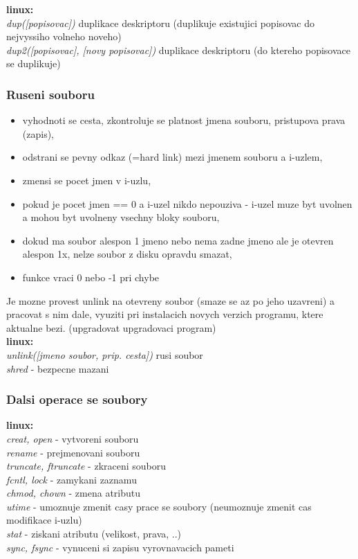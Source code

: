 \documentclass[a4paper, 11pt]{article}
\begin{document}
\textbf{linux:} \\[0.5em]
\textit{dup([popisovac])} duplikace deskriptoru (duplikuje existujici popisovac do nejvyssiho volneho noveho) \\[0.2em]
\textit{dup2([popisovac], [novy popisovac])} duplikace deskriptoru (do ktereho popisovace se duplikuje) \\

\subsubsection{Ruseni souboru}
\begin{itemize}
    \item vyhodnoti se cesta, zkontroluje se platnost jmena souboru, pristupova prava (zapis),
    \item odstrani se pevny odkaz (=hard link) mezi jmenem souboru a i-uzlem,
    \item zmensi se pocet jmen v i-uzlu,
    \item pokud je pocet jmen == 0 a i-uzel nikdo nepouziva - i-uzel muze byt uvolnen a mohou byt uvolneny vsechny bloky souboru,
    \item dokud ma soubor alespon 1 jmeno nebo nema zadne jmeno ale je otevren alespon 1x, nelze soubor z disku opravdu smazat,
    \item funkce vraci 0 nebo -1 pri chybe \\
\end{itemize}

Je mozne provest unlink na otevreny soubor (smaze se az po jeho uzavreni) a pracovat s nim dale,
vyuziti pri instalacich novych verzich programu, ktere aktualne bezi. (upgradovat upgradovaci program) \\

\textbf{linux:} \\[0.5em]
\textit{unlink([jmeno soubor, prip. cesta])} rusi soubor \\[0.2em]
\textit{shred} - bezpecne mazani \\

\subsubsection{Dalsi operace se soubory}

\textbf{linux:} \\[0.5em]
\textit{creat, open} - vytvoreni souboru \\[0.2em]
\textit{rename} - prejmenovani souboru \\[0.2em]
\textit{truncate, ftruncate} - zkraceni souboru \\[0.2em]
\textit{fcntl, lock} - zamykani zaznamu \\[0.2em]
\textit{chmod, chown} - zmena atributu \\[0.2em]
\textit{utime} - umoznuje zmenit casy prace se soubory (neumoznuje zmenit cas modifikace i-uzlu) \\[0.2em]
\textit{stat} - ziskani atributu (velikost, prava, ..) \\[0.2em]
\textit{sync, fsync} - vynuceni si zapisu vyrovnavacich pameti \\
\end{document}
